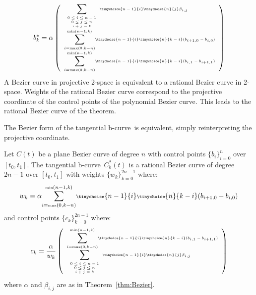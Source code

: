 \documentclass[12pt]{article}
\newcommand{\btang}{tangential b-curve\ }
\begin{document}
\[
\label{eq:dualcoord}
\tiny{
b^*_k = \alpha
\left(
\begin{array}{l}
	\displaystyle{\sum_{\begin{array}{c} \mbox{\tiny{$0 \leq i \leq n-1$}} \\ 
		       \mbox{\tiny{$0 \leq j \leq n$}} \\ 
		       \mbox{\tiny{$i+j=k$}} \end{array}}}
	\tinychoice{n-1}{i} \tinychoice{n}{j} \beta_{i,j} \\
%	
	\displaystyle{\sum_{i=\mbox{\tiny{max}}(0,k-n)}^{\mbox{\tiny{min}}(n-1,k)}}
	\tinychoice{n-1}{i} \tinychoice{n}{k-i} (b_{i+1,0} - b_{i,0})\\
%	
	\displaystyle{\sum_{i=\mbox{\tiny{max}}(0,k-n)}^{\mbox{\tiny{min}}(n-1,k)}}
	\tinychoice{n-1}{i} \tinychoice{n}{k-i} (b_{i,1} - b_{i+1,1})
\end{array}
\right)}
\]
%
A Bezier curve in projective 2-space is equivalent to a 
rational Bezier curve in 2-space.
Weights of the rational Bezier curve correspond to the
projective coordinate of the control points of the polynomial Bezier curve.
This leads to the rational Bezier curve of the theorem.
\QED

\noindent The Bezier form of the \btang is equivalent, 
simply reinterpreting the projective coordinate.
%
\begin{theorem}
\label{thm:rationaldualb}
Let $C(t)$ be a plane Bezier curve of degree $n$ 
with control points $\{ b_i \}_{i=0}^n$ over $[t_0,t_1]$.
The \btang $C_b^*(t)$ is a rational Bezier curve of degree $2n-1$ 
over $[t_0,t_1]$ with weights $\{w_k\}_{k=0}^{2n-1}$ where: 
\begin{displaymath}
\scriptsize{
w_k = \alpha
\displaystyle{\sum_{i=\mbox{\tiny{max}}(0,k-n)}^{\mbox{\tiny{min}}(n-1,k)}}
	\tinychoice{n-1}{i} \tinychoice{n}{k-i} (b_{i+1,0} - b_{i,0})
}
\end{displaymath}
%
and control points $\{c_k\}_{k=0}^{2n-1}$ where:
\begin{displaymath}
\tiny{
c_k = \frac{\alpha}{w_k} 
\left(
\begin{array}{l}
	\displaystyle{\sum_{i=\mbox{\tiny{max}}(0,k-n)}^{\mbox{\tiny{min}}(n-1,k)}}
	\tinychoice{n-1}{i} \tinychoice{n}{k-i} (b_{i,1} - b_{i+1,1})\\
%
	\displaystyle{\sum_{\begin{array}{c} \mbox{\tiny{$0 \leq i \leq n-1$}} \\ 
		       \mbox{\tiny{$0 \leq j \leq n$}} \\ 
		       \mbox{\tiny{$i+j=k$}} \end{array}}}
	\tinychoice{n-1}{i} \tinychoice{n}{j} \beta_{i,j}
\end{array}
\right)
}
\end{displaymath}
where $\alpha$ and $\beta_{i,j}$ are as in Theorem~\ref{thm:Bezier}.
\end{theorem}
\end{document}

